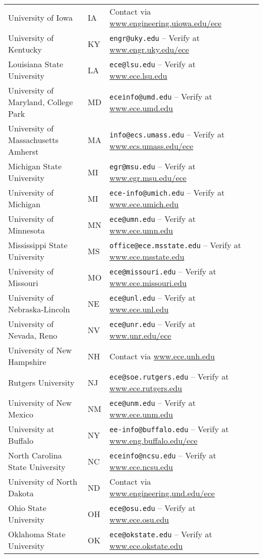 \documentclass[12pt]{article}
\begin{document}
\begin{longtable}{p{} p{1cm} p{} p{0mm}}
University of Iowa & IA & Contact via \url{www.engineering.uiowa.edu/ece} \\
University of Kentucky & KY & \texttt{engr@uky.edu} – Verify at \url{www.engr.uky.edu/ece} \\
Louisiana State University & LA & \texttt{ece@lsu.edu} – Verify at \url{www.ece.lsu.edu} \\
University of Maryland, College Park & MD & \texttt{eceinfo@umd.edu} – Verify at \url{www.ece.umd.edu} \\
University of Massachusetts Amherst & MA & \texttt{info@ecs.umass.edu} – Verify at \url{www.ecs.umass.edu/ece} \\
Michigan State University & MI & \texttt{egr@msu.edu} – Verify at \url{www.egr.msu.edu/ece} \\
University of Michigan & MI & \texttt{ece-info@umich.edu} – Verify at \url{www.ece.umich.edu} \\
University of Minnesota & MN & \texttt{ece@umn.edu} – Verify at \url{www.ece.umn.edu} \\
Mississippi State University & MS & \texttt{office@ece.msstate.edu} – Verify at \url{www.ece.msstate.edu} \\
University of Missouri & MO & \texttt{ece@missouri.edu} – Verify at \url{www.ece.missouri.edu} \\
University of Nebraska-Lincoln & NE & \texttt{ece@unl.edu} – Verify at \url{www.ece.unl.edu} \\
University of Nevada, Reno & NV & \texttt{ece@unr.edu} – Verify at \url{www.unr.edu/ece} \\
University of New Hampshire & NH & Contact via \url{www.ece.unh.edu} \\
Rutgers University & NJ & \texttt{ece@soe.rutgers.edu} – Verify at \url{www.ece.rutgers.edu} \\
University of New Mexico & NM & \texttt{ece@unm.edu} – Verify at \url{www.ece.unm.edu} \\
University at Buffalo & NY & \texttt{ee-info@buffalo.edu} – Verify at \url{www.eng.buffalo.edu/ece} \\
North Carolina State University & NC & \texttt{eceinfo@ncsu.edu} – Verify at \url{www.ece.ncsu.edu} \\
University of North Dakota & ND & Contact via \url{www.engineering.und.edu/ece} \\
Ohio State University & OH & \texttt{ece@osu.edu} – Verify at \url{www.ece.osu.edu} \\
Oklahoma State University & OK & \texttt{ece@okstate.edu} – Verify at \url{www.ece.okstate.edu} \\

\end{longtable}
\end{document}
